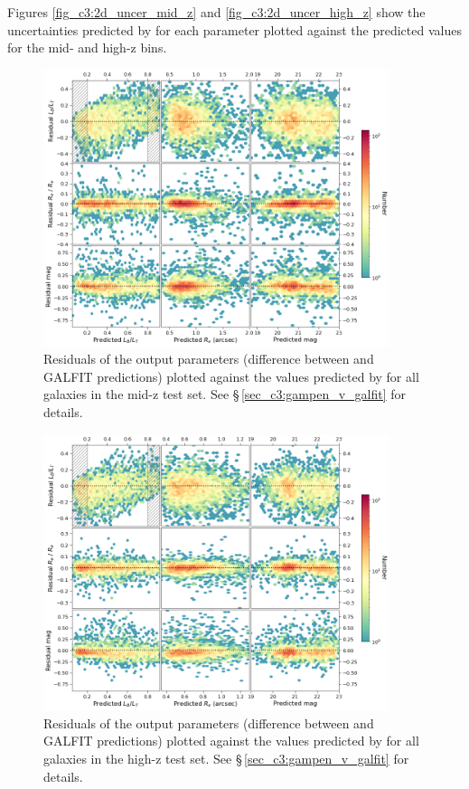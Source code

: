 Figures \ref{fig_c3:2d_uncer_mid_z} and \ref{fig_c3:2d_uncer_high_z} show the uncertainties predicted by \gampen{} for each parameter plotted against the predicted values for the mid- and high-z bins.

\begin{figure}[htb]
    \centering
    \includegraphics[width = 0.9\textwidth]{2d_res_mid_z.png}
    \caption{Residuals of the output parameters (difference between \gampen{} and GALFIT predictions) plotted against the values predicted by \gampen{} for all galaxies in the mid-z test set. See \S\,\ref{sec_c3:gampen_v_galfit} for details.}
    \label{fig_c3:2d_res_mid_z}
\end{figure}

\begin{figure}[htb]
    \centering
    \includegraphics[width = 0.9\textwidth]{2d_res_high_z.png}
    \caption{Residuals of the output parameters (difference between \gampen{} and GALFIT predictions) plotted against the values predicted by \gampen{} for all galaxies in the high-z test set. See \S\,\ref{sec_c3:gampen_v_galfit} for details.}
    \label{fig_c3:2d_res_high_z}
\end{figure}

